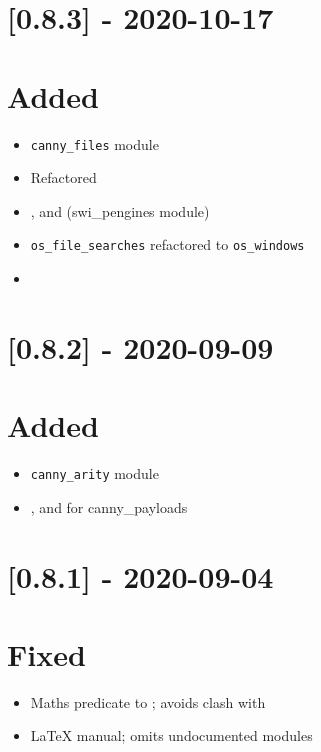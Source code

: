 \section{[0.8.3] - 2020-10-17}

\section{Added}

\begin{itemize}
    \item \verb$canny_files$ module
    \item Refactored 
    \item {},  and  (swi_pengines module)
    \item \verb$os_file_searches$ refactored to \verb$os_windows$
    \item {}
\end{itemize}

\section{[0.8.2] - 2020-09-09}

\section{Added}

\begin{itemize}
    \item \verb$canny_arity$ module
    \item {},  and  for canny_payloads
\end{itemize}

\section{[0.8.1] - 2020-09-04}

\section{Fixed}

\begin{itemize}
    \item Maths predicate  to ; avoids clash with 
    \item LaTeX manual; omits undocumented modules
\end{itemize}

